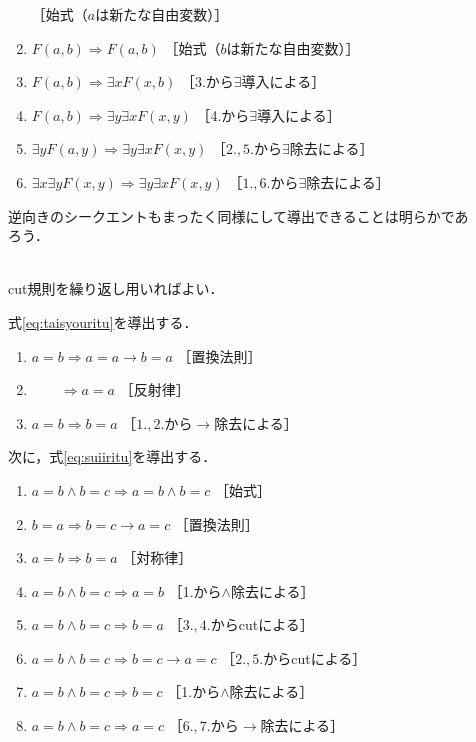 \begin{description}
\begin{enumerate}[1. ]
           \quad ［始式（$a$は新たな自由変数）］
    \item $F(a, b) \Longrightarrow F(a,b)$ \quad ［始式（$b$は新たな自由変数）］
    \item $F(a,b) \Longrightarrow \exists x F(x,b)$ \quad ［3.から$\exists$導入による］
    \item $F(a,b) \Longrightarrow \exists y \exists x F(x,y)$
           \quad ［4.から$\exists$導入による］
    \item $\exists y F(a,y) \Longrightarrow \exists y \exists x F(x,y)$
           \quad ［$2., 5.$から$\exists$除去による］
         \item $\exists x \exists y F(x,y) \Longrightarrow \exists y \exists x F(x,y)$
           \quad ［$1., 6.$から$\exists$除去による］
  \end{enumerate}
  逆向きのシークエントもまったく同様にして導出できることは明らかであろう．
\item[\refque{que:circdouti}] \mbox{} \\
  cut規則を繰り返し用いればよい．
\item[\refque{que:taisyousuii}] \mbox \\
  式\eqref{eq:taisyouritu}を導出する．
  \begin{enumerate}[1. ]
    \item $a =b \Longrightarrow a =a \to b =a$ \quad ［置換法則］
    \item $\qquad \Longrightarrow a =a$ \quad ［反射律］
    \item $a = b \Longrightarrow b =a$ \quad ［$1., 2.$から$\to$除去による］
  \end{enumerate}
  次に，式\eqref{eq:suiiritu}を導出する．
  \begin{enumerate}[1. ]
    \item $a =b \land b=c \Longrightarrow a = b \land b =c$ \quad ［始式］
    \item $b=a \Longrightarrow b=c \to a=c$ \quad ［置換法則］
    \item $a = b \Longrightarrow b =a$ \quad ［対称律］
    \item $a=b \land b=c \Longrightarrow a=b$ \quad ［1.から$\land$除去による］
    \item $a=b \land b=c \Longrightarrow b=a$ \quad ［$3., 4.$からcutによる］
    \item $a=b \land b=c \Longrightarrow b=c \to a=c$ \quad ［$2., 5.$からcutによる］
    \item $a =b \land b=c \Longrightarrow b=c$ \quad ［1.から$\land$除去による］
    \item $a=b \land b=c \Longrightarrow a=c$ \quad ［$6., 7.$から$\to$除去による］

\end{enumerate}
\end{description}
